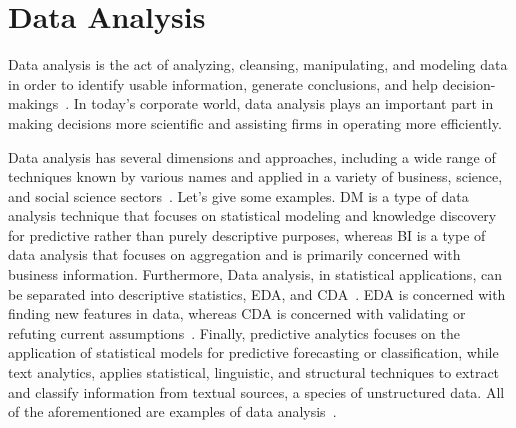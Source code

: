 \section{Data Analysis}\label{section:data_anal}
Data analysis is the act of analyzing, cleansing, manipulating, and modeling data in order to identify usable information, generate conclusions, and help decision-makings~\cite{Book:sbrown_2014_transforming}.
In today's corporate world, data analysis plays an important part in making decisions more scientific and assisting firms in operating more efficiently.

Data analysis has several dimensions and approaches, including a wide range of techniques known by various names and applied in a variety of business, science, and social science sectors~\cite{Book:pruneau_2017}.
Let's give some examples.
\ac{DM} is a type of data analysis technique that focuses on statistical modeling and knowledge discovery for predictive rather than purely descriptive purposes,
whereas \ac{BI} is a type of data analysis that focuses on aggregation and is primarily concerned with business information.
Furthermore, Data analysis, in statistical applications, can be separated into descriptive statistics, \ac{EDA}, and \ac{CDA}~\cite{Book:doing_data_science}.
\ac{EDA} is concerned with finding new features in data, whereas \ac{CDA} is concerned with validating or refuting current assumptions~\cite{Article:intro_to_data_analysis}.
Finally, predictive analytics focuses on the application of statistical models for predictive forecasting or classification,
while text analytics, applies statistical, linguistic, and structural techniques to extract and classify information from textual sources, a species of unstructured data.
All of the aforementioned are examples of data analysis~\cite{Article:goodnight_2011_the}.

